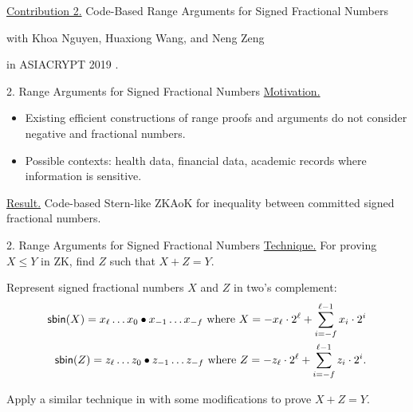\begin{frame}
	\underline{Contribution 2.} Code-Based Range Arguments for Signed Fractional Numbers
	
	{\small with Khoa Nguyen, Huaxiong Wang, and Neng Zeng}
	
	in ASIACRYPT 2019 \cite{NguyenTWZ19}.
\end{frame}

\begin{frame}{2. Range Arguments for Signed Fractional Numbers}
	\underline{Motivation.} 
	\begin{itemize}
		\item Existing efficient constructions of range proofs and arguments do not consider negative and fractional numbers.
		\item Possible contexts: health data, financial data, academic records where information is sensitive.
	\end{itemize}

	\underline{Result.} Code-based Stern-like ZKAoK for inequality between committed signed fractional numbers.
	
\end{frame}

\begin{frame}{2. Range Arguments for Signed Fractional Numbers}
	\underline{Technique.} For proving $X \leq Y$ in ZK, find $Z$ such that $X + Z = Y$.
	
	Represent signed fractional numbers $X$ and $Z$ in two's complement:
	\begin{align*}
		\mathsf{sbin}(X) = x_\ell \dots x_0\bullet x_{-1}\dots x_{-f} \text{ where } X = -x_\ell \cdot 2^{\ell} + \sum_{i = -f}^{\ell-1} x_i\cdot 2^i\\ 
		\mathsf{sbin}(Z) = z_\ell \dots z_0\bullet z_{-1}\dots z_{-f} \text{ where } Z = -z_\ell \cdot 2^{\ell} + \sum_{i = -f}^{\ell-1} z_i\cdot 2^i.
	\end{align*}

	Apply a similar technique in \cite{LibertLNW18} with some modifications to prove $X + Z = Y$.
\end{frame}